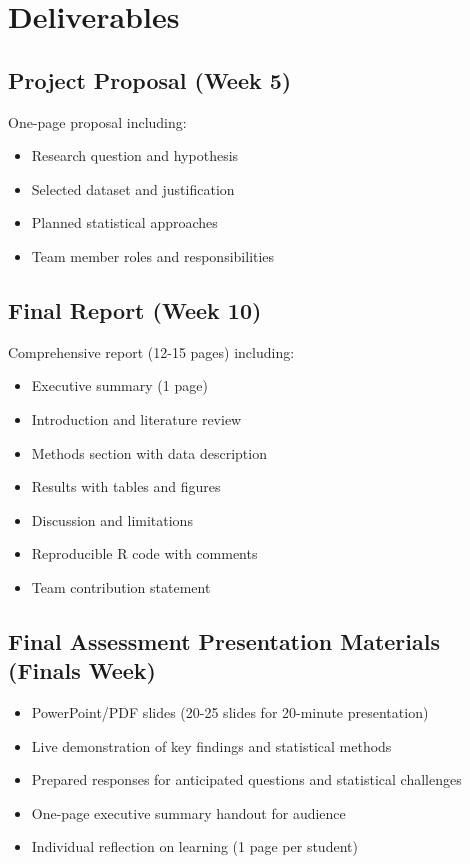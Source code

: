 \documentclass[11pt]{article}
\begin{document}
\section{Deliverables}

\subsection{Project Proposal (Week 5)}
One-page proposal including:
\begin{itemize}
\item Research question and hypothesis
\item Selected dataset and justification
\item Planned statistical approaches
\item Team member roles and responsibilities
\end{itemize}

\subsection{Final Report (Week 10)}
Comprehensive report (12-15 pages) including:
\begin{itemize}
\item Executive summary (1 page)
\item Introduction and literature review
\item Methods section with data description
\item Results with tables and figures
\item Discussion and limitations
\item Reproducible R code with comments
\item Team contribution statement
\end{itemize}

\subsection{Final Assessment Presentation Materials (Finals Week)}
\begin{itemize}
\item PowerPoint/PDF slides (20-25 slides for 20-minute presentation)
\item Live demonstration of key findings and statistical methods
\item Prepared responses for anticipated questions and statistical challenges
\item One-page executive summary handout for audience
\item Individual reflection on learning (1 page per student)
\end{itemize}
\end{document}

